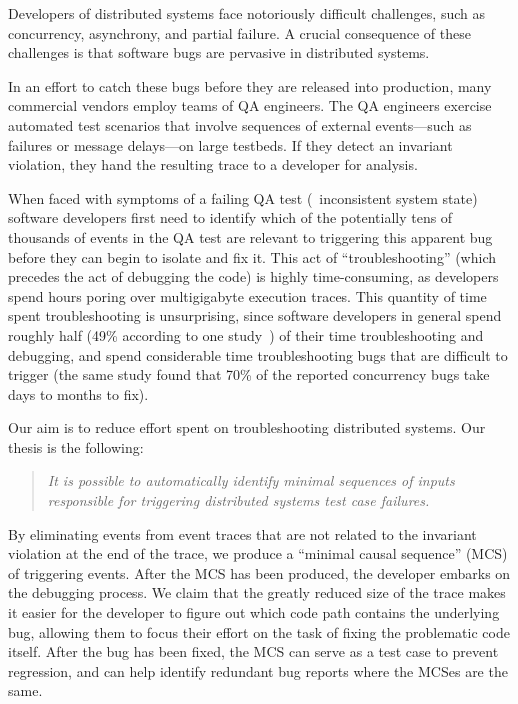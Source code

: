 Developers of distributed systems face notoriously difficult challenges, such as concurrency, asynchrony, and
partial failure. A crucial consequence of these challenges is that software
bugs are pervasive in distributed systems.

In an effort to catch these bugs
before they are released into production, many commercial vendors employ
teams of QA engineers. The QA engineers exercise automated test scenarios that involve
sequences of external events---such as failures or message delays---on large testbeds.
If they detect an invariant violation, they hand the resulting trace to a developer for analysis.

When faced with symptoms of a failing QA test (\eg~inconsistent system state)
software developers first need to identify which of the potentially tens of
thousands of events in the QA test are relevant to triggering
this apparent bug before they can begin to isolate and fix it.
This act of ``troubleshooting'' (which precedes the act of debugging the
code) is highly time-consuming, as developers spend hours poring
over multigigabyte execution traces. This quantity of time spent
troubleshooting is unsurprising, since software developers in general spend roughly half (49\% according to one
study~\cite{msoft_concurrency}) of their time troubleshooting and debugging, and spend
considerable time troubleshooting bugs that are difficult to trigger (the same study found
that 70\% of the reported concurrency bugs take days to months to fix).

Our aim is to reduce effort spent on troubleshooting distributed systems.
Our thesis is the following:
\begin{quote}
{\it
It is possible to
automatically identify minimal sequences of inputs
responsible for triggering
distributed systems test case failures.
}
\end{quote}
By eliminating events from event traces that are not related to the
invariant violation at the end of the trace, we produce a ``minimal
causal sequence'' (MCS) of triggering events. After the MCS has been produced, the developer embarks
on the debugging process. We claim that the greatly reduced size of the
trace makes it easier for the developer to figure out which code path contains
the underlying bug, allowing them to focus their effort on
the task of fixing the problematic code itself. After the bug has been fixed, the MCS
can serve as a test case to prevent regression,
and can help identify redundant bug reports where the MCSes are the same.

